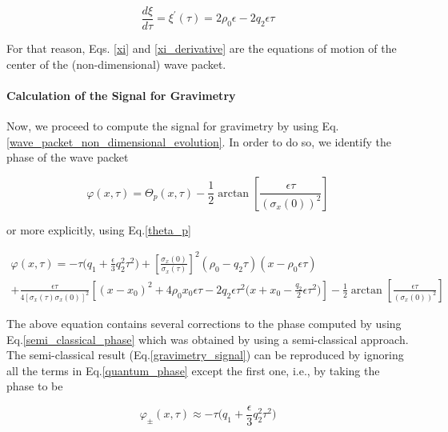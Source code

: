 \documentclass{article}
\begin{document}
\begin{equation}\label{xi_derivative}
\frac{d\xi}{d\tau} = \xi^{\prime}(\tau) =  2 \rho_{0} \epsilon - 2 q_{2}\epsilon \tau
\end{equation}

For that reason, Eqs. \ref{xi} and \ref{xi_derivative} are the equations of motion of the center of the (non-dimensional) wave packet.

\paragraph{Calculation of the Signal for Gravimetry}

Now, we proceed to compute the signal for gravimetry by using Eq.\ref{wave_packet_non_dimensional_evolution}. In order to do so, we identify the phase of the wave packet

\begin{equation}
\varphi(x, \tau) = \Theta_{p}(x, \tau) - \frac{1}{2}\arctan\left[\frac{\epsilon \tau}{(\sigma_{x}(0))^{2}}\right]
\end{equation}

or more explicitly, using Eq.\ref{theta_p}

\begin{multline}\label{quantum_phase}
\varphi(x, \tau) = -\tau \bigg(q_{1} + \frac{\epsilon}{3} q_{2}^{2} \tau^{2}\bigg) + \left[\frac{\sigma_{x}(0)}{\sigma_{x}(\tau)} \right]^{2} (\rho_{0} - q_{2} \tau)(x-\rho_{0} \epsilon \tau) \\
+ \frac{\epsilon \tau}{4 [\sigma_{x}(\tau)\sigma_{x}(0)]^{2}} \left[(x-x_{0})^{2} + 4\rho_{0} x_{0} \epsilon \tau -2q_{2} \epsilon \tau^{2} \bigg(x+x_{0}- \frac{q_{2}}{2} \epsilon \tau^{2} \bigg)\right] 
- \frac{1}{2}\arctan\left[\frac{\epsilon \tau}{(\sigma_{x}(0))^{2}}\right]
\end{multline}

The above equation contains several corrections to the phase computed by using Eq.\ref{semi_classical_phase} which was obtained by using a semi-classical approach. The semi-classical result (Eq.\ref{gravimetry_signal}) can be reproduced by ignoring all the terms in Eq.\ref{quantum_phase} except the first one, i.e., by taking the phase to be

\begin{equation}\label{approx_quantum_phase}
\varphi_{\pm}(x, \tau) \approx -\tau \bigg(q_{1} + \frac{\epsilon}{3} q_{2}^{2} \tau^{2}\bigg)
\end{equation}
\end{document}
